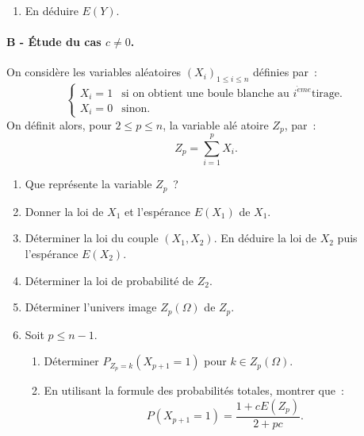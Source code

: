 \begin{exercice}
\begin{enumerate}
\item En d\'{e}duire $E(Y)$.
\end{enumerate}

\paragraph{\small{B - \'Etude du cas $c\neq 0$.}\\}

On consid\`{e}re les variables al\'{e}atoires $\left( X_{i}\right)
_{1\leqslant i\leqslant n}$ d\'{e}finies par~: 
\begin{equation*}
\begin{cases}
X_{i}=1 & \text{si on obtient une boule blanche au }i^{\grave{e}me}\text{
tirage.} \\ 
X_{i}=0 & \text{sinon.}%
\end{cases}%
\end{equation*}%
On d\'{e}finit alors, pour $2\leqslant p\leqslant n$, la variable al\'{e}%
atoire $Z_{p}$, par~: 
\begin{equation*}
Z_{p}=\sum_{i=1}^{p}X_{i}.
\end{equation*}

\begin{enumerate}
\item Que repr\'{e}sente la variable $Z_{p}$~?

\item Donner la loi de $X_{1}$ et l'esp\'{e}rance $E(X_{1})$ de $X_{1}$.

\item D\'{e}terminer la loi du couple $(X_{1},X_{2})$. En d\'{e}duire la loi
de $X_{2}$ puis l'esp\'{e}rance $E(X_{2})$.

\item D\'{e}terminer la loi de probabilit\'{e} de $Z_{2}$.

\item D\'{e}terminer l'univers image $Z_{p}\left( \Omega \right) $ de $Z_{p} 
$.

\item Soit $p\leqslant n-1$.

\begin{enumerate}
\item D\'{e}terminer $P_{Z_{p}=k}(X_{p+1}=1)$ pour $k\in Z_{p}\left( \Omega
\right) $.

\item En utilisant la formule des probabilit\'{e}s totales, montrer que~: 
\begin{equation*}
P(X_{p+1}=1)=\frac{1+cE(Z_{p})}{2+pc}.
\end{equation*}


\end{enumerate}
\end{enumerate}
\end{exercice}
